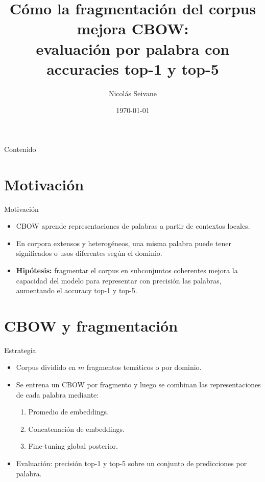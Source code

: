 \documentclass[11pt]{beamer}
\title[CBOW + Fragmentación]{Cómo la fragmentación del corpus mejora CBOW: \\ evaluación por palabra con accuracies top-1 y top-5}
\author[N. Seivane]{Nicolás Seivane}
\institute[Tu Institución]{Departamento / Laboratorio \\ Tu Institución}
\date{\today}
\begin{document}
	
	\begin{frame}
		\titlepage
	\end{frame}
	
	\begin{frame}{Contenido}
		\tableofcontents
	\end{frame}
	
	\section{Motivación}
	\begin{frame}{Motivación}
		\begin{itemize}
			\item CBOW aprende representaciones de palabras a partir de contextos locales.
			\item En corpora extensos y heterogéneos, una misma palabra puede tener significados o usos diferentes según el dominio.
			\item \textbf{Hipótesis:} fragmentar el corpus en subconjuntos coherentes mejora la capacidad del modelo para representar con precisión las palabras, aumentando el accuracy top-1 y top-5.
		\end{itemize}
	\end{frame}
	
	\section{CBOW y fragmentación}
	\begin{frame}{Estrategia}
		\begin{itemize}
			\item Corpus dividido en $m$ fragmentos temáticos o por dominio.
			\item Se entrena un CBOW por fragmento y luego se combinan las representaciones de cada palabra mediante:
			\begin{enumerate}
				\item Promedio de embeddings.
				\item Concatenación de embeddings.
				\item Fine-tuning global posterior.
			\end{enumerate}
			\item Evaluación: precisión top-1 y top-5 sobre un conjunto de predicciones por palabra.
		\end{itemize}
	\end{frame}
	
\end{document}
